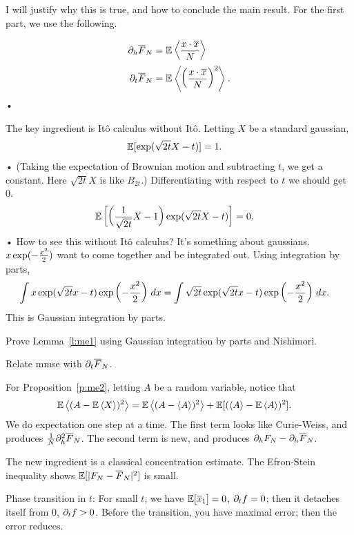 I will justify why this is true, and how to conclude the main result.
For the first part, we use the following.
\begin{lem}\label{l:me1}
\begin{align*}
\partial_h \overline{F}_N &= \mathbb{E}\left\langle {\frac{x\cdot \overline{x}}{N}}\right\rangle\\
\partial_t \overline{F}_N &= \mathbb{E}\left\langle {\left( {\frac{x\cdot\overline{x}}{N}} \right)^2}\right\rangle.
\end{align*}•
\end{lem}

The key ingredient is It\^o calculus without It\^o. 
Letting $X$ be a standard gaussian, 
\begin{align*}
\mathbb{E}[\exp(\sqrt{2t}X-t)]&=1.
\end{align*}•
(Taking the expectation of Brownian motion and subtracting $t$, we get a constant. Here $\sqrt{2t}X$ is like $B_{2t}$.)
Differentiating with respect to $t$ we should get 0.
\begin{align*}
\mathbb{E}\left[ {
\left( {
\frac{1}{\sqrt{2t}}X-1
} \right)\exp(\sqrt{2t}X-t)
} \right]&=0.
\end{align*}•
How to see this without It\^o calculus? It's something about gaussians. $x\exp(-\frac{x^2}{2})$ want to come together and be integrated out. %
Using integration by parts,
\begin{align*}
\int x \exp(\sqrt{2t}x-t) \exp\left( {-\frac{x^2}{2}} \right)\,dx
&= \int \sqrt{2t}\exp(\sqrt{2t}x-t) \exp\left( {-\frac{x^2}{2}} \right)\,dx.
\end{align*}
This is Gaussian integration by parts.
\begin{exr}
Prove Lemma~\ref{l:me1} using Gaussian integration by parts and Nishimori.
\item
Relate mmse with $\partial_t \overline{F}_N$.
\end{exr}
For Proposition~\ref{p:me2}, letting $A$ be a random variable, notice that 
\begin{align*}
\mathbb{E}\left\langle {(A-\mathbb{E}\left\langle {X}\right\rangle)^2}\right\rangle
&= \mathbb{E}\left\langle {(A-\left\langle {A}\right\rangle)^2}\right\rangle 
+ \mathbb{E}[(\left\langle {A}\right\rangle-\mathbb{E}\left\langle {A}\right\rangle)^2].
\end{align*}
We do expectation one step at a time.
The first term looks like Curie-Weiss, and produces $\frac{1}{N} \partial_h^2 \overline{F}_N$. The second term is new, and produces $\partial_h F_N - \partial_h\overline{F}_N$.

The new ingredient is a classical concentration estimate. The Efron-Stein %
inequality shows $\mathbb{E}[|F_N-\overline{F}_N|^2]$ is small.

Phase transition in $t$: For small $t$, we have $\mathbb{E}[\overline{x}_1]=0$, $\partial_t f=0$; then it detaches itself from 0, $\partial_t f>0$.
Before the transition, you have maximal error; then the error reduces.

